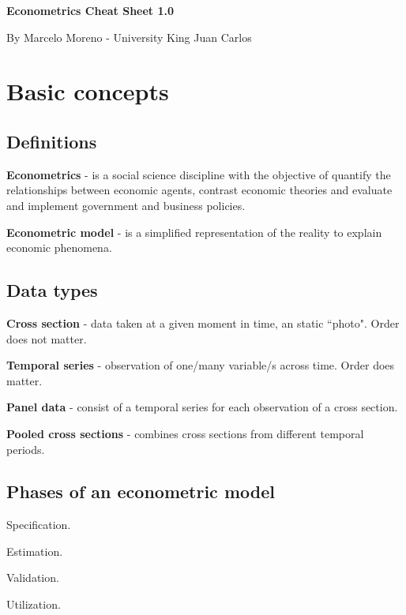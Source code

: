 \documentclass[10pt,landscape]{article}
\begin{document}
\begin{multicols}{3} %

\textbf{\Large Econometrics Cheat Sheet 1.0}

\begin{scriptsize}
By Marcelo Moreno - University King Juan Carlos
\end{scriptsize}

\section*{Basic concepts}
\subsection*{Definitions}

\textbf{Econometrics} - is a social science discipline with the objective of quantify the relationships between economic agents, contrast economic theories and evaluate and implement government and business policies.

\textbf{Econometric model} - is a simplified representation of the reality to explain economic phenomena.

\subsection*{Data types}

\textbf{Cross section} - data taken at a given moment in time, an static ``photo". Order does not matter.

\textbf{Temporal series} - observation of one/many variable/s across time. Order does matter.

\textbf{Panel data} - consist of a temporal series for each observation of a cross section.

\textbf{Pooled cross sections} - combines cross sections from different temporal periods.

\subsection*{Phases of an econometric model}

\begin{enumerate}[leftmargin=*]
\setlength{\multicolsep}{0pt}
\begin{multicols}{2}
\item Specification.
\item Estimation.
\columnbreak
\item Validation.
\item Utilization.
\end{multicols}
\end{enumerate}


\end{multicols}
\end{document}
